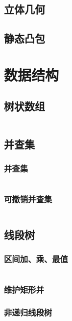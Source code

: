 \documentclass[a4paper, twoside]{article}
\begin{document}
\subsection{立体几何}

\subsection{静态凸包}

\newpage
\section{数据结构}
\subsection{树状数组}
\inputminted{cpp}{../src/数据结构/树状数组.cpp}

\subsection{并查集}
    \subsubsection{并查集}
    \inputminted{cpp}{../src/数据结构/并查集.cpp}

    \subsubsection{可撤销并查集}
    \inputminted{cpp}{../src/数据结构/可撤销并查集.cpp}

\subsection{线段树}
    \subsubsection{区间加、乘、最值}
    \inputminted{cpp}{../src/数据结构/线段树（区间加、乘、最值）.cpp}

    \subsubsection{维护矩形并}

    \subsubsection{非递归线段树}
\end{document}
